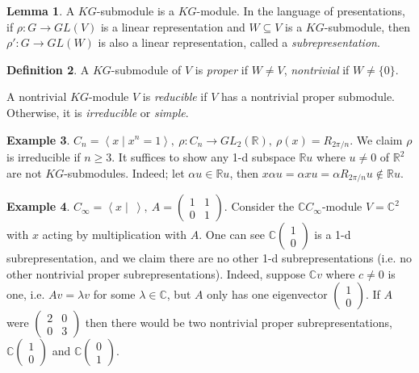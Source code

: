 \documentclass[a4paper]{article}
\newcommand{\la}{\left\langle}
\newcommand{\ra}{\right\rangle}
\newcommand{\R}{\mathbb{R}}
\newcommand{\C}{\mathbb{C}}
\theoremstyle{definition}
\newtheorem{defn}{Definition}[subsection]
\newtheorem{lemma}[defn]{Lemma}
\newtheorem{example}[defn]{Example}
\begin{document}
\begin{lemma}
A $KG$-submodule is a $KG$-module. In the language of presentations, if $\rho:G\rightarrow GL(V)$ is a linear representation and $W\subseteq V$ is a $KG$-submodule, then $\rho':G\rightarrow GL(W)$ is also a linear representation, called a \textit{subrepresentation}.
\end{lemma}

\begin{defn}
A $KG$-submodule of $V$ is \textit{proper} if $W\neq V$, \textit{nontrivial} if $W\neq \{0\}$.

A nontrivial $KG$-module $V$ is \textit{reducible} if $V$ has a nontrivial proper submodule. Otherwise, it is \textit{irreducible} or \textit{simple}.
\end{defn}

\begin{example}
\label{example:realrepofCnirreducible}
$C_n=\la x\mid x^n=1\ra,\ \rho:C_n\rightarrow GL_2(\R),\ \rho(x)=R_{2\pi/n}$. We claim $\rho$ is irreducible if $n\geq 3$. It suffices to show any 1-d subspace $\R u$ where $u\neq 0$ of $\R^2$ are not $KG$-submodules. Indeed; let $\alpha u\in\R u$, then $x\alpha u=\alpha xu=\alpha R_{2\pi/n}u\notin\R u$.
\end{example}

\begin{example}
\label{example:Cinfxactsby1101}
$C_\infty=\la x\mid \ \ra,\ A=\begin{pmatrix}1&1\\0&1\end{pmatrix}$. Consider the $\C C_\infty$-module $V=\C^2$ with $x$ acting by multiplication with $A$. One can see $\C\begin{pmatrix}1\\0\end{pmatrix}$ is a 1-d subrepresentation, and we claim there are no other 1-d subrepresentations (i.e. no other nontrivial proper subrepresentations). Indeed, suppose $\C v$ where $c\neq 0$ is one, i.e. $Av=\lambda v$ for some $\lambda\in\C$, but $A$ only has one eigenvector $\begin{pmatrix}1\\0\end{pmatrix}$. If $A$ were $\begin{pmatrix}2&0\\0&3\end{pmatrix}$ then there would be two nontrivial proper subrepresentations, $\C\begin{pmatrix}1\\0\end{pmatrix}$ and $\C\begin{pmatrix}0\\1\end{pmatrix}$.
\end{example}
\end{document}
